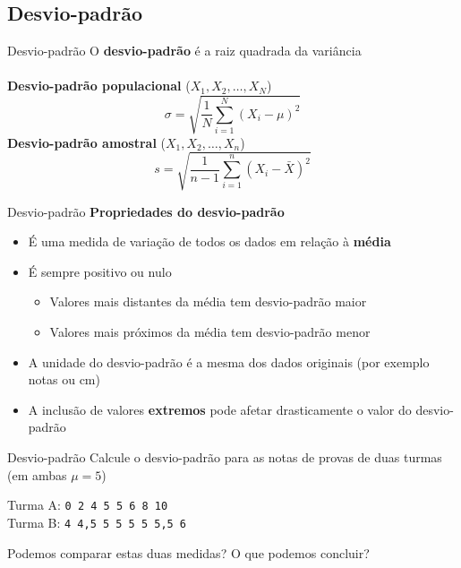 \documentclass[10pt]{beamer}\usepackage[]{graphicx}\usepackage[]{color}
\theoremstyle{definition}
\begin{document}
\subsection{Desvio-padrão}

\begin{frame}{Desvio-padrão}
  O \textbf{desvio-padrão} é a raiz quadrada da variância\\~\\
  \textbf{Desvio-padrão populacional} ($X_1, X_2, \ldots, X_N$)
  \begin{equation*}
    \sigma = \sqrt{\frac{1}{N} \sum_{i=1}^{N} (X_i - \mu)^2}
  \end{equation*}
  \vspace{1em}
    \textbf{Desvio-padrão amostral} ($X_1, X_2, \ldots, X_n$)
  \begin{equation*}
    s = \sqrt{\frac{1}{n-1} \sum_{i=1}^{n} (X_i - \bar{X})^2}
  \end{equation*}
\end{frame}

\begin{frame}{Desvio-padrão}
  \textbf{Propriedades do desvio-padrão} \vspace{1em}
  \begin{itemize}
  \item É uma medida de variação de todos os dados em relação à
    \textbf{média}
  \item É sempre positivo ou nulo
    \begin{itemize}
    \item Valores mais distantes da média tem desvio-padrão maior
    \item Valores mais próximos da média tem desvio-padrão menor
    \end{itemize}
  \item A unidade do desvio-padrão é a mesma dos dados originais (por
    exemplo notas ou cm)
  \item A inclusão de valores \textbf{extremos} pode afetar
    drasticamente o valor do desvio-padrão
  \end{itemize}
\end{frame}

\begin{frame}{Desvio-padrão}
  Calcule o desvio-padrão para as notas de provas de duas turmas (em
  ambas $\mu=5$)
  \begin{center}
    Turma A: \texttt{0 2 4 5 5 6 8 10} \\ \vspace{1em}
    Turma B: \texttt{4 4,5 5 5 5 5 5,5 6}
  \end{center}
  Podemos comparar estas duas medidas? O que podemos concluir?
\end{frame}
\end{document}
